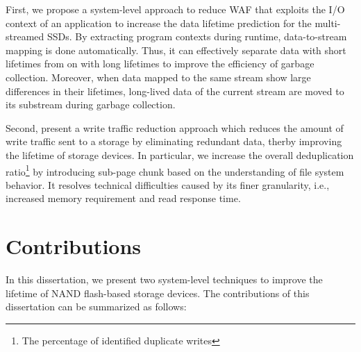 First, we propose a system-level approach to reduce WAF that exploits
the I/O context of an application to increase the data lifetime prediction
for the multi-streamed SSDs. 
By extracting program contexts during runtime, data-to-stream mapping is done automatically.
Thus, it can effectively separate data with
short lifetimes from on with long lifetimes to improve the efficiency of garbage collection.
Moreover, when data mapped to the same
stream show large differences in their lifetimes,
long-lived data of the current stream are moved to 
its substream during garbage collection.

Second, present a write traffic reduction approach which reduces the amount of
write traffic sent to a storage by eliminating redundant data, therby improving
the lifetime of storage devices. In particular, we increase the overall
deduplication ratio\footnote{The percentage of identified duplicate writes}
by introducing sub-page chunk based on the understanding of file system behavior.
It resolves technical difficulties caused by its finer granularity, i.e., increased memory requirement and read
response time. 

\section{Contributions}
In this dissertation, we present two system-level techniques to improve the 
lifetime of NAND flash-based storage devices. 
The contributions of this dissertation can be summarized as follows:

